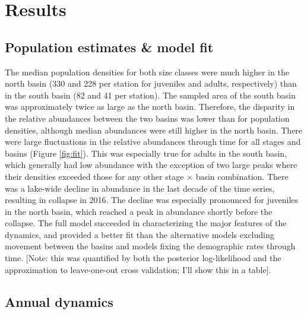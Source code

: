 

\section*{Results}


\subsection*{Population estimates \& model fit}

The median population densities for both size classes were much higher
in the north basin (330 and 228 per station for juveniles and adults, respectively)
than in the south basin (82 and 41 per station).
The sampled area of the south basin 
was approximately twice as large as the north basin.
Therefore, the disparity in the relative abundances between the two basins was 
lower than for population densities,
although median abundances were still higher in the north basin.
There were large fluctuations in the relative abundances through time
for all stages and basins (Figure \ref{fig:fit}). 
This was especially true for adults in the south basin, 
which generally had low abundance with the exception of two large peaks
where their densities exceeded those for any other stage $\times$ basin combination.
There was a lake-wide decline in abundance in the last decade of the time series,
resulting in collapse in 2016. 
The decline was especially pronounced for juveniles in the north basin,
which reached a peak in abundance shortly before the collapse.
The full model succeeded in characterizing the major features of the dynamics, 
and provided a better fit than the alternative models excluding movement 
between the basins and models fixing the demographic rates through time. 
[Note: this was quantified by both the posterior log-likelihood
and the approximation to leave-one-out cross validation; I'll show this in a table].


\subsection*{Annual dynamics}

